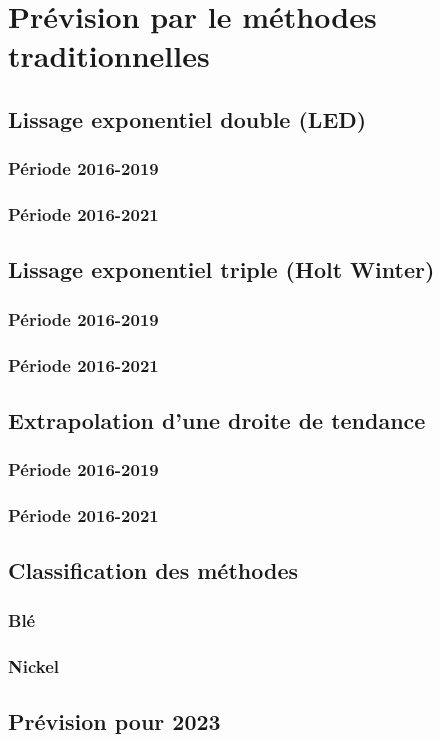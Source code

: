 \documentclass[11pt,a4paper]{article}
\begin{document}
\section{Prévision par le méthodes traditionnelles}
\subsection{Lissage exponentiel double (LED)}
\subsubsection{Période 2016-2019}
\subsubsection{Période 2016-2021}
\subsection{Lissage exponentiel triple (Holt Winter)}
\subsubsection{Période 2016-2019}
\subsubsection{Période 2016-2021}
\subsection{Extrapolation d'une droite de tendance}
\subsubsection{Période 2016-2019}
\subsubsection{Période 2016-2021}
\subsection{Classification des méthodes}
\subsubsection{Blé}
\subsubsection{Nickel}
\subsection{Prévision pour 2023}
\end{document}
